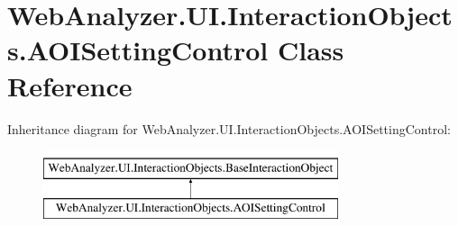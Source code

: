 \hypertarget{class_web_analyzer_1_1_u_i_1_1_interaction_objects_1_1_a_o_i_setting_control}{}\section{Web\+Analyzer.\+U\+I.\+Interaction\+Objects.\+A\+O\+I\+Setting\+Control Class Reference}
\label{class_web_analyzer_1_1_u_i_1_1_interaction_objects_1_1_a_o_i_setting_control}
Inheritance diagram for Web\+Analyzer.\+U\+I.\+Interaction\+Objects.\+A\+O\+I\+Setting\+Control\+:\begin{figure}[H]
\begin{center}
\leavevmode
\includegraphics[height=2.000000cm]{class_web_analyzer_1_1_u_i_1_1_interaction_objects_1_1_a_o_i_setting_control}
\end{center}
\end{figure}
